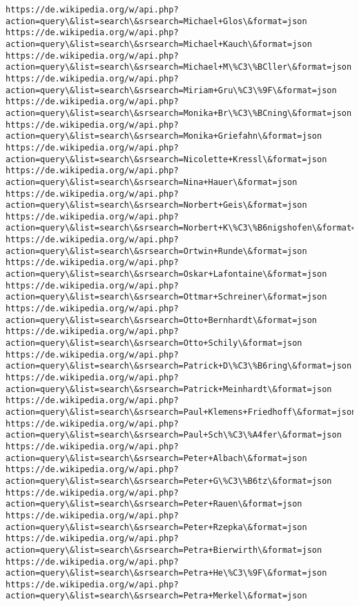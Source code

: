 \documentclass[11pt]{article}
\begin{document}
\begin{Verbatim}[commandchars=\\\{\}]
https://de.wikipedia.org/w/api.php?action=query\&list=search\&srsearch=Michael+Glos\&format=json
https://de.wikipedia.org/w/api.php?action=query\&list=search\&srsearch=Michael+Kauch\&format=json
https://de.wikipedia.org/w/api.php?action=query\&list=search\&srsearch=Michael+M\%C3\%BCller\&format=json
https://de.wikipedia.org/w/api.php?action=query\&list=search\&srsearch=Miriam+Gru\%C3\%9F\&format=json
https://de.wikipedia.org/w/api.php?action=query\&list=search\&srsearch=Monika+Br\%C3\%BCning\&format=json
https://de.wikipedia.org/w/api.php?action=query\&list=search\&srsearch=Monika+Griefahn\&format=json
https://de.wikipedia.org/w/api.php?action=query\&list=search\&srsearch=Nicolette+Kressl\&format=json
https://de.wikipedia.org/w/api.php?action=query\&list=search\&srsearch=Nina+Hauer\&format=json
https://de.wikipedia.org/w/api.php?action=query\&list=search\&srsearch=Norbert+Geis\&format=json
https://de.wikipedia.org/w/api.php?action=query\&list=search\&srsearch=Norbert+K\%C3\%B6nigshofen\&format=json
https://de.wikipedia.org/w/api.php?action=query\&list=search\&srsearch=Ortwin+Runde\&format=json
https://de.wikipedia.org/w/api.php?action=query\&list=search\&srsearch=Oskar+Lafontaine\&format=json
https://de.wikipedia.org/w/api.php?action=query\&list=search\&srsearch=Ottmar+Schreiner\&format=json
https://de.wikipedia.org/w/api.php?action=query\&list=search\&srsearch=Otto+Bernhardt\&format=json
https://de.wikipedia.org/w/api.php?action=query\&list=search\&srsearch=Otto+Schily\&format=json
https://de.wikipedia.org/w/api.php?action=query\&list=search\&srsearch=Patrick+D\%C3\%B6ring\&format=json
https://de.wikipedia.org/w/api.php?action=query\&list=search\&srsearch=Patrick+Meinhardt\&format=json
https://de.wikipedia.org/w/api.php?action=query\&list=search\&srsearch=Paul+Klemens+Friedhoff\&format=json
https://de.wikipedia.org/w/api.php?action=query\&list=search\&srsearch=Paul+Sch\%C3\%A4fer\&format=json
https://de.wikipedia.org/w/api.php?action=query\&list=search\&srsearch=Peter+Albach\&format=json
https://de.wikipedia.org/w/api.php?action=query\&list=search\&srsearch=Peter+G\%C3\%B6tz\&format=json
https://de.wikipedia.org/w/api.php?action=query\&list=search\&srsearch=Peter+Rauen\&format=json
https://de.wikipedia.org/w/api.php?action=query\&list=search\&srsearch=Peter+Rzepka\&format=json
https://de.wikipedia.org/w/api.php?action=query\&list=search\&srsearch=Petra+Bierwirth\&format=json
https://de.wikipedia.org/w/api.php?action=query\&list=search\&srsearch=Petra+He\%C3\%9F\&format=json
https://de.wikipedia.org/w/api.php?action=query\&list=search\&srsearch=Petra+Merkel\&format=json

\end{Verbatim}
\end{document}
